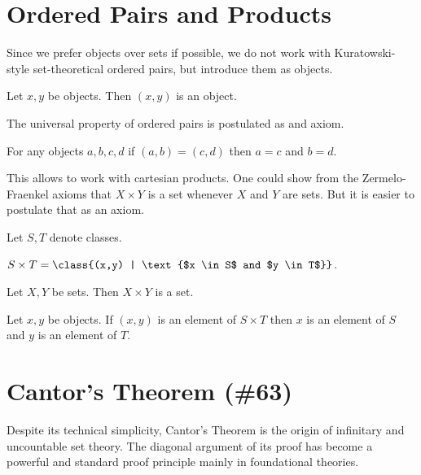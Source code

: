 \documentclass{article}
\begin{document}
\section{Ordered Pairs and Products}

Since we prefer objects over sets if possible, we do not work
with Kuratowski-style set-theoretical ordered pairs, but
introduce them as objects.
\begin{forthel}
  \begin{lemma}
    Let $x, y$ be objects.
    Then $(x,y)$ is an object.
  \end{lemma}
\end{forthel}
%
The universal property of ordered pairs is postulated as
and axiom.
%
\begin{forthel}
  \begin{axiom}
    For any objects $a, b, c, d$ if $(a,b) = (c,d)$ then $a = c$ and $b = d$.
  \end{axiom}
\end{forthel}
This allows to work with cartesian products. One could show
from the Zermelo-Fraenkel axioms that $X \times Y$ is a set
whenever $X$ and $Y$ are sets. But it is easier to postulate
that as an axiom.
%
\begin{forthel}
  Let $S, T$ denote classes.

  \begin{definition}
    $S \times T = \class{(x,y) | \text{$x \in S$ and $y \in T$}}$.
  \end{definition}

  \begin{axiom}
    Let $X, Y$ be sets.
    Then $X \times Y$ is a set.
  \end{axiom}

  \begin{lemma}
    Let $x, y$ be objects.
    If $(x,y)$ is an element of $S \times T$ then $x$ is an element of $S$ and
    $y$ is an element of $T$.
  \end{lemma}

\end{forthel}



\section{Cantor's Theorem (\#63)}

Despite its technical simplicity, Cantor's Theorem is the origin of
infinitary and uncountable set theory. The diagonal argument of
its proof has become a powerful and standard proof principle mainly
in foundational theories.
\end{document}
